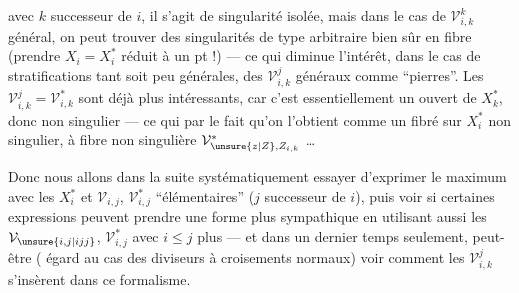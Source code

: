 avec $k$ successeur de $i$, il s'agit de singularité isolée, mais dans le cas de $\mathcal{V}_{i,k}^k$ général, on peut trouver des singularités de type arbitraire bien sûr en fibre (prendre $X_i=X_i^*$ réduit à un pt !) — ce qui diminue l'intérêt, dans le cas de stratifications tant soit peu générales, des $\mathcal{V}_{i,k}^j$ généraux comme ``pierres''. Les $\mathcal{V}_{i,k}^{j}=\mathcal{V}_{i,k}^*$ sont déjà plus intéressants, car  c'est essentiellement un  ouvert de $X_k^*$, donc non singulier — ce qui  par le fait qu'on l'obtient comme un fibré sur $X_i^*$ non singulier, à fibre non singulière $\mathcal{V}_{\unsure{z|Z},Z_{i,k}}^*$ \ldots

Donc nous allons dans la suite systématiquement essayer d'exprimer le maximum avec les $X_i^*$ et  $\mathcal{V}_{i,j}$, $\mathcal{V}_{i,j}^*$ ``élémentaires'' ($j$ successeur de $i$), puis voir si certaines expressions peuvent prendre une forme plus sympathique en utilisant aussi  les $\mathcal{V}_{\unsure{i,j|ijj}}$, $\mathcal{V}_{i,j}^*$ avec $i\leq j$  plus — et dans un dernier temps seulement, peut-être ( égard au cas des diviseurs à croisements normaux) voir comment les $\mathcal{V}_{i,k}^j$ s'insèrent dans ce formalisme.
